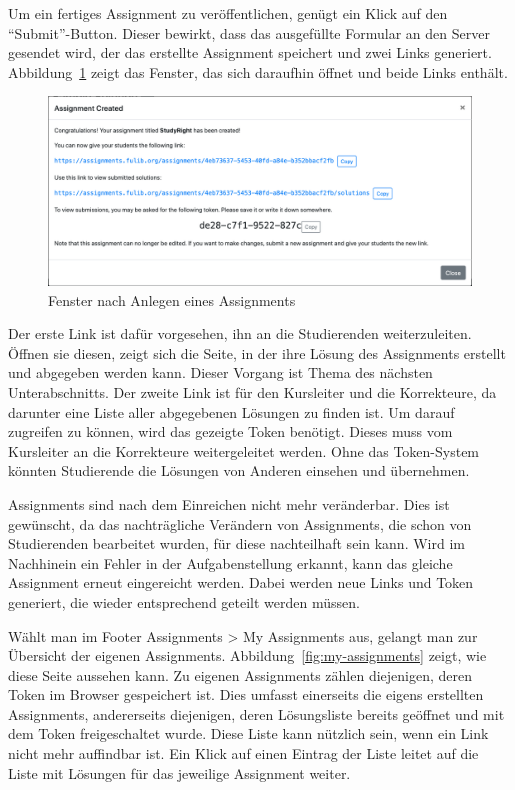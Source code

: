 Um ein fertiges Assignment zu veröffentlichen, genügt ein Klick auf den ``Submit''-Button.
Dieser bewirkt, dass das ausgefüllte Formular an den Server gesendet wird, der das erstellte Assignment speichert und zwei Links generiert.
Abbildung~\ref{fig:create-assignment-success} zeigt das Fenster, das sich daraufhin öffnet und beide Links enthält.

\begin{figure}
    \centering
    \includegraphics[width=\textwidth]{chapter/fulib.org/img/create-assignment-success.png}
    \caption{Fenster nach Anlegen eines Assignments}
    \label{fig:create-assignment-success}
\end{figure}

Der erste Link ist dafür vorgesehen, ihn an die Studierenden weiterzuleiten.
Öffnen sie diesen, zeigt sich die Seite, in der ihre Lösung des Assignments erstellt und abgegeben werden kann.
Dieser Vorgang ist Thema des nächsten Unterabschnitts.
Der zweite Link ist für den Kursleiter und die Korrekteure, da darunter eine Liste aller abgegebenen Lösungen zu finden ist.
Um darauf zugreifen zu können, wird das gezeigte Token benötigt.
Dieses muss vom Kursleiter an die Korrekteure weitergeleitet werden.
Ohne das Token-System könnten Studierende die Lösungen von Anderen einsehen und übernehmen.

Assignments sind nach dem Einreichen nicht mehr veränderbar.
Dies ist gewünscht, da das nachträgliche Verändern von Assignments, die schon von Studierenden bearbeitet wurden, für diese nachteilhaft sein kann.
Wird im Nachhinein ein Fehler in der Aufgabenstellung erkannt, kann das gleiche Assignment erneut eingereicht werden.
Dabei werden neue Links und Token generiert, die wieder entsprechend geteilt werden müssen.

Wählt man im Footer Assignments > My Assignments aus, gelangt man zur Übersicht der eigenen Assignments.
Abbildung~\ref{fig:my-assignments} zeigt, wie diese Seite aussehen kann.
Zu eigenen Assignments zählen diejenigen, deren Token im Browser gespeichert ist.
Dies umfasst einerseits die eigens erstellten Assignments, andererseits diejenigen, deren Lösungsliste bereits geöffnet und mit dem Token freigeschaltet wurde.
Diese Liste kann nützlich sein, wenn ein Link nicht mehr auffindbar ist.
Ein Klick auf einen Eintrag der Liste leitet auf die Liste mit Lösungen für das jeweilige Assignment weiter.

